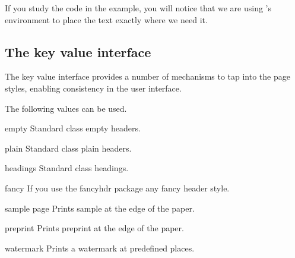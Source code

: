 %
%
%
%
%

If you study the code in the example, you will notice that we are using \LaTeXe's  environment to
place the text exactly where we need it.




\subsection{The key value interface}

The key value interface provides a number of mechanisms to tap into the page styles, enabling consistency in the user interface.

\medskip

 The following values can be used.

\begin{marglist}
\item [empty] Standard class empty headers.
\item [plain] Standard class plain headers.
\item [headings] Standard class headings.
\item [fancy] If you use the fancyhdr package any fancy header style.
\item [sample page] Prints sample at the edge of the paper.
\item [preprint] Prints preprint at the edge of the paper.
\item [watermark] Prints a watermark at predefined places.
\end{marglist}

